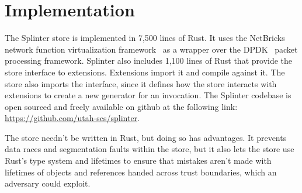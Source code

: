 \section{Implementation}
\label{sec:implementation}

The Splinter store is implemented in 7,500 lines of Rust. It uses the
  NetBricks network function virtualization framework~\cite{netbricks-2016} as a
  wrapper over the DPDK~\cite{dpdk} packet processing framework.
Splinter also includes 1,100 lines of Rust that
  provide the store interface to extensions. Extensions import it and
  compile against it.
The store also imports the interface, since it defines how the store interacts
  with extensions to create a new generator for an invocation.
The Splinter codebase is open sourced and freely available on github at
the following link:
\url{https://github.com/utah-scs/splinter}.

The store needn't be written in Rust, but doing so has advantages.
It prevents data races and segmentation faults within the store, but
  it also lets the store use Rust's type system and lifetimes to ensure that
  mistakes aren't made with lifetimes of objects and references
  handed across trust boundaries, which an adversary could exploit.
